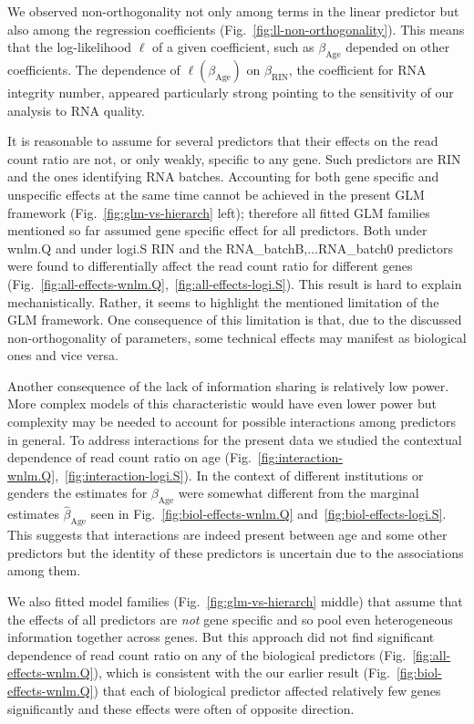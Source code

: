 \documentclass[letterpaper]{article}
\begin{document}
We observed non-orthogonality not only among terms in the linear predictor but
also among the regression coefficients (Fig.~\ref{fig:ll-non-orthogonality}).
This means that the log-likelihood \(\ell\) of a given coefficient, such as
\(\beta_\mathrm{Age}\) depended on other coefficients.  The dependence of
\(\ell(\beta_\mathrm{Age})\) on \(\beta_\mathrm{RIN}\), the coefficient for
RNA integrity number, appeared particularly strong pointing to the sensitivity
of our analysis to RNA quality.

It is reasonable to assume for several predictors that their effects on the
read count ratio are not, or only weakly, specific to any gene.  Such predictors are RIN
and the ones identifying RNA batches.  Accounting for both gene specific and
unspecific effects at the same time cannot be achieved in the present GLM
framework (Fig.~\ref{fig:glm-vs-hierarch} left); therefore all fitted GLM
families mentioned so far assumed gene specific effect for all predictors.
Both under wnlm.Q and under logi.S RIN and the RNA\_batchB,...RNA\_batch0
predictors were found to differentially affect the read count ratio for
different genes
(Fig.~\ref{fig:all-effects-wnlm.Q},~\ref{fig:all-effects-logi.S}).  This result
is hard to explain mechanistically.  Rather, it seems to highlight the
mentioned limitation of the GLM framework.  One consequence of this limitation
is that, due to the discussed non-orthogonality of parameters, some technical
effects may manifest as biological ones and vice versa.

Another consequence of the lack of information sharing is relatively low
power.  More complex models of this characteristic would have even lower power
but complexity may be needed to account for possible interactions among predictors in
general.  To address interactions for the present data we studied the contextual
dependence of read count ratio on age
(Fig.~\ref{fig:interaction-wnlm.Q},~\ref{fig:interaction-logi.S}).  In the
context of different institutions or genders the estimates for
\(\beta_\mathrm{Age}\) were somewhat different from the marginal estimates
\(\hat\beta_\mathrm{Age}\) seen in Fig.~\ref{fig:biol-effects-wnlm.Q}
and~\ref{fig:biol-effects-logi.S}.  This suggests that interactions are indeed
present between age and some other predictors but the identity of these
predictors is uncertain due to the associations among them.

We also fitted model families (Fig.~\ref{fig:glm-vs-hierarch} middle) that
assume that the effects of all predictors are \emph{not} gene specific and so
pool even heterogeneous information together across genes.  But this approach
did not find significant dependence of read count ratio on any of the
biological predictors (Fig.~\ref{fig:all-effects-wnlm.Q}), which is consistent
with the our earlier result (Fig.~\ref{fig:biol-effects-wnlm.Q}) that each of
biological predictor affected relatively few genes significantly and these
effects were often of opposite direction.
\end{document}
